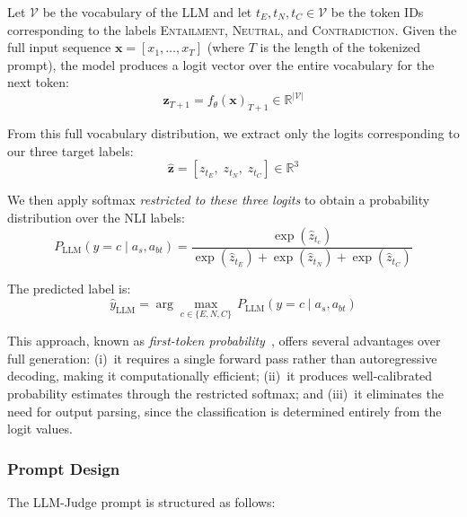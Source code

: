     Let $\mathcal{V}$ be the vocabulary of the LLM and let $t_E, t_N, t_C \in \mathcal{V}$ be the token IDs corresponding to the labels \textsc{Entailment}, \textsc{Neutral}, and \textsc{Contradiction}. Given the full input sequence $\mathbf{x} = [x_1, \ldots, x_T]$ (where $T$ is the length of the tokenized prompt), the model produces a logit vector over the entire vocabulary for the next token:
    \begin{equation}
        \mathbf{z}_{T+1} = f_{\theta}(\mathbf{x})_{T+1} \in \mathbb{R}^{|\mathcal{V}|}
    \end{equation}

    From this full vocabulary distribution, we extract only the logits corresponding to our three target labels:
    \begin{equation}
        \hat{\mathbf{z}} = [z_{t_E}, \; z_{t_N}, \; z_{t_C}] \in \mathbb{R}^{3}
    \end{equation}

    We then apply softmax \textit{restricted to these three logits} to obtain a probability distribution over the NLI labels:
    \begin{equation}
        P_{\text{LLM}}(y = c \mid a_s, a_{bt}) = \frac{\exp(\hat{z}_{t_c})}{\exp(\hat{z}_{t_E}) + \exp(\hat{z}_{t_N}) + \exp(\hat{z}_{t_C})}
        \label{eq:first_token}
    \end{equation}

    The predicted label is:
    \begin{equation}
        \hat{y}_{\text{LLM}} = \arg\max_{c \in \{E, N, C\}} \, P_{\text{LLM}}(y = c \mid a_s, a_{bt})
    \end{equation}

    This approach, known as \textit{first-token probability}~\cite{chen2024seeing}, offers several advantages over full generation: (i)~it requires a single forward pass rather than autoregressive decoding, making it computationally efficient; (ii)~it produces well-calibrated probability estimates through the restricted softmax; and (iii)~it eliminates the need for output parsing, since the classification is determined entirely from the logit values.

    \subsubsection{Prompt Design}

    The LLM-Judge prompt is structured as follows:

